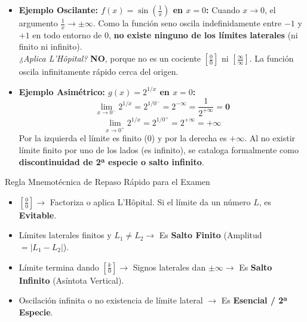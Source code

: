 \documentclass[10pt,a4paper]{article}
\begin{document}
\begin{itemize}\itemsep 3pt
    \item \textbf{Ejemplo Oscilante: $f(x) = \sin\left(\frac{1}{x}\right)$ en $x = 0$:}
    Cuando $x \to 0$, el argumento $\frac{1}{x} \to \pm\infty$. Como la función seno oscila indefinidamente entre $-1$ y $+1$ en todo entorno de 0, \textbf{no existe ninguno de los límites laterales} (ni finito ni infinito).\\
    \textit{¿Aplica L'Hôpital?} \textbf{NO}, porque no es un cociente $\left[\frac{0}{0}\right]$ ni $\left[\frac{\infty}{\infty}\right]$. La función oscila infinitamente rápido cerca del origen.

    \item \textbf{Ejemplo Asimétrico: $g(x) = 2^{1/x}$ en $x = 0$:}
    $$\lim_{x \to 0^-} 2^{1/x} = 2^{1/0^-} = 2^{-\infty} = \frac{1}{2^{+\infty}} = \mathbf{0}$$
    $$\lim_{x \to 0^+} 2^{1/x} = 2^{1/0^+} = 2^{+\infty} = \mathbf{+\infty}$$
    Por la izquierda el límite es finito ($0$) y por la derecha es $+\infty$. Al no existir límite finito por uno de los lados (es infinito), se cataloga formalmente como \textbf{discontinuidad de 2ª especie o salto infinito}.
\end{itemize}

\vspace{3mm}

\begin{trucobox}{Regla Mnemotécnica de Repaso Rápido para el Examen}
\small
\begin{itemize}\itemsep 1.5pt
    \item $\left[\frac{0}{0}\right] \to$ Factoriza o aplica L'Hôpital. Si el límite da un número $L$, es \textbf{Evitable}.
    \item Límites laterales finitos y $L_1 \neq L_2 \to$ Es \textbf{Salto Finito} (Amplitud $= |L_1 - L_2|$).
    \item Límite termina dando $\left[\frac{k}{0}\right] \to$ Signos laterales dan $\pm\infty \to$ Es \textbf{Salto Infinito} (Asíntota Vertical).
    \item Oscilación infinita o no existencia de límite lateral $\to$ Es \textbf{Esencial / 2ª Especie}.
\end{itemize}
\end{trucobox}
\end{document}
